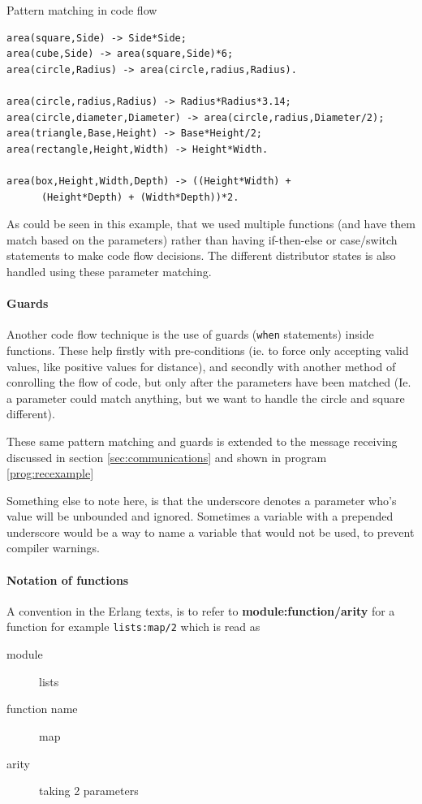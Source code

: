 \documentclass[a4paper,11pt]{report}
\begin{document}
\begin{Program}
\caption{Pattern matching in code flow}
\label{prog:pattern}
\begin{lstlisting}
area(square,Side) -> Side*Side;
area(cube,Side) -> area(square,Side)*6;
area(circle,Radius) -> area(circle,radius,Radius).

area(circle,radius,Radius) -> Radius*Radius*3.14;
area(circle,diameter,Diameter) -> area(circle,radius,Diameter/2);
area(triangle,Base,Height) -> Base*Height/2;
area(rectangle,Height,Width) -> Height*Width.

area(box,Height,Width,Depth) -> ((Height*Width) +
      (Height*Depth) + (Width*Depth))*2.
\end{lstlisting}
\end{Program}

As could be seen in this example, that we used multiple functions (and
have them match based on the parameters) rather than having
if-then-else or case/switch statements to make code flow
decisions. The different distributor states is also handled using
these parameter matching.

\paragraph{Guards} 
\label{par:guards}Another code flow technique is the use of guards
(\texttt{when} statements) inside functions. These help firstly with
pre-conditions (ie. to force only accepting valid values, like
positive values for distance), and secondly with another method of
conrolling the flow of code, but only after the parameters have been
matched (Ie. a parameter could match anything, but we want to handle
the circle and square different).

These same pattern matching and guards is extended to the message
receiving discussed in section \ref{sec:communications} and shown in
program \ref{prog:recexample}

Something else to note here, is that the underscore denotes a
parameter who's value will be unbounded and ignored. Sometimes a
variable with a prepended underscore would be a way to name a
variable that would not be used, to prevent compiler warnings.

\paragraph{Notation of functions}

A convention in the Erlang texts, is to refer to
\textbf{module:function/arity} for a function for example
\texttt{lists:map/2} which is read as
\begin{description}
\item[module] lists
\item[function name] map
\item[arity] taking 2 parameters
\end{description}
\end{document}
